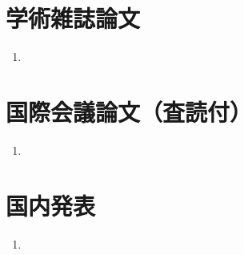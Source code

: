
\publications

\section*{学術雑誌論文}

\begin{enumerate}
  \item
\end{enumerate}



\section*{国際会議論文（査読付）}

\begin{enumerate}
  \item
\end{enumerate}



\section*{国内発表}

\begin{enumerate}
  \item
\end{enumerate}
